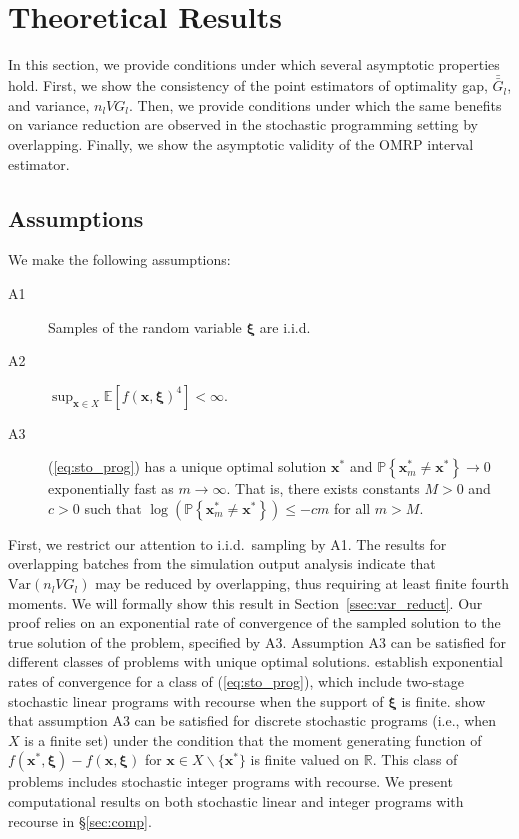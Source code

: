 \documentclass[12pt]{article}
\newcommand{\R}{{\mathbb{R}}}
\newcommand{\p}[1]{\mathbb{P} \left\{ #1 \right\}}
\newcommand{\e}[1]{\mathbb{E} \left[ #1 \right]
}
\newcommand{\var}[1]{\mathrm{Var} \left( #1 \right)}
\newcommand{\x}{\mathbf{x}}
\newcommand{\xs}{\x^*}
\newcommand{\xit}{\boldsymbol{\xi}}
\newcommand{\gb}{\bar{G}}
\newcommand{\gbb}{\bar{\gb}}
\begin{document}
\section{Theoretical Results} 
\label{sec:theory}

In this section, we provide conditions under which several asymptotic properties hold. 
First, we show the consistency of the point estimators of optimality gap, $\gbb_l$, and variance, $n_l VG_l$. 
Then, we provide conditions under which the same benefits on variance reduction are observed in the stochastic programming setting by overlapping. 
Finally, we show the asymptotic validity of the OMRP interval estimator. 

\subsection{Assumptions}
\label{subsec:assumptions}

We make the following assumptions:

\begin{description}
	\item[A1] Samples of the random variable $\xit$ are i.i.d.
	\item[A2] $\sup_{\x \in X} \e{f(\x,\xit)^{4}} < \infty$.
	\item[A3] (\ref{eq:sto_prog}) has a unique optimal solution $\xs$ and $\p{\xs_m \neq \xs} \rightarrow 0$ exponentially fast as $m \rightarrow \infty$.  
           That is, there exists constants $M > 0$ and $c > 0$ such that $\log(\p{\xs_m \neq \xs}) \leq -cm$ for all $m > M$.
\end{description}

First, we restrict our attention to i.i.d.\ sampling by A1.
The results for overlapping batches from the simulation output analysis indicate that $\var{n_l VG_l}$ may be reduced by overlapping, thus requiring at least finite fourth moments. 
We will formally show this result in Section~\ref{ssec:var_reduct}.
Our proof relies on an exponential rate of convergence of the sampled solution to the true solution of the problem, specified by A3.  
Assumption A3 can be satisfied for different classes of problems with unique optimal solutions.  
\citet{shapiro2000rate} establish exponential rates of convergence for a class of (\ref{eq:sto_prog}), which include two-stage stochastic linear programs with recourse when the support of $\xit$ is finite.   
\citet{kleywegt2002sample} show that assumption A3 can be satisfied for discrete stochastic programs (i.e., when $X$ is a finite set) under the condition that the moment generating function of $f(\xs,\xit) - f(\x,\xit)$ for $\x \in X \backslash \{\xs\}$ is finite valued on $\R$.  
This class of problems includes stochastic integer programs with recourse.
  We present computational results on both stochastic linear and integer programs with recourse in \S \ref{sec:comp}.
\end{document}
